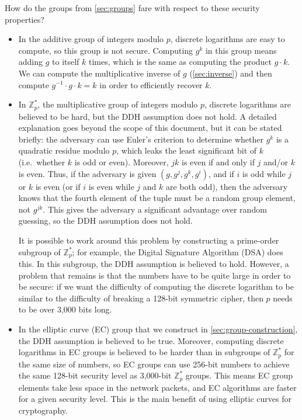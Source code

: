 \documentclass{article}
\begin{document}
How do the groups from \autoref{sec:groups} fare with respect to these security properties?
\begin{itemize}
\item In the additive group of integers modulo $p$, discrete logarithms are easy to compute, so this group is not secure.
    Computing $g^k$ in this group means adding $g$ to itself $k$ times, which is the same as computing the product $g \cdot k$.
    We can compute the multiplicative inverse of $g$ (\autoref{sec:inverse}) and then compute $g^{-1} \cdot g \cdot k = k$ in order to efficiently recover $k$.

\item In $\mathbb{Z}_p^*$, the multiplicative group of integers modulo $p$, discrete logarithms are believed to be hard, but the DDH assumption does not hold.
    A detailed explanation goes beyond the scope of this document, but it can be stated briefly: the adversary can use Euler's criterion to determine whether $g^k$ is a quadratic residue modulo $p$, which leaks the least significant bit of $k$ (i.e.\ whether $k$ is odd or even).
    Moreover, $jk$ is even if and only if $j$ and/or $k$ is even.
    Thus, if the adversary is given $(g, g^j, g^k, g^i)$, and if $i$ is odd while $j$ or $k$ is even (or if $i$ is even while $j$ and $k$ are both odd), then the adversary knows that the fourth element of the tuple must be a random group element, not $g^{jk}$.
    This gives the adversary a significant advantage over random guessing, so the DDH assumption does not hold.

    It is possible to work around this problem by constructing a prime-order subgroup of $\mathbb{Z}_p^*$; for example, the Digital Signature Algorithm (DSA) does this.
    In this subgroup, the DDH assumption is believed to hold.
    However, a problem that remains is that the numbers have to be quite large in order to be secure: if we want the difficulty of computing the discrete logarithm to be similar to the difficulty of breaking a 128-bit symmetric cipher, then $p$ needs to be over 3,000 bits long.

\item In the elliptic curve (EC) group that we construct in \autoref{sec:group-construction}, the DDH assumption is believed to be true.
    Moreover, computing discrete logarithms in EC groups is believed to be harder than in subgroups of $\mathbb{Z}_p^*$ for the same size of numbers, so EC groups can use 256-bit numbers to achieve the same 128-bit security level as 3,000-bit $\mathbb{Z}_p^*$ groups.
    This means EC group elements take less space in the network packets, and EC algorithms are faster for a given security level.
    This is the main benefit of using elliptic curves for cryptography.
\end{itemize}
\end{document}
